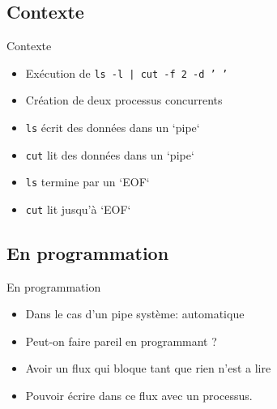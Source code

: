 \section{\sectitle}
\begin{frame}{\sectitle}
\def\subsectitle{Contexte}
\subsection{\subsectitle}

\begin{exampleblock}{\subsectitle}

\begin{itemize}
    \item Exécution de \texttt{ls -l | cut -f 2 -d ' '}
    \item Création de deux processus concurrents
    \item \texttt{ls} écrit des données dans un `pipe` 
    \item \texttt{cut} lit des données dans un `pipe`
    \item \texttt{ls} termine par un `EOF`
    \item \texttt{cut} lit jusqu'à `EOF`
\end{itemize}
\end{exampleblock}
\def\subsectitle{En programmation}
\subsection{\subsectitle}
\begin{block}{\subsectitle}
\begin{itemize}
    \item Dans le cas d'un pipe système: automatique
    \item Peut-on faire pareil en programmant ?
    \item Avoir un flux qui bloque tant que rien n'est a lire
    \item Pouvoir écrire dans ce flux avec un processus.
\end{itemize}
\end{block}
\end{frame}

\def\sectitle{Tubes}
